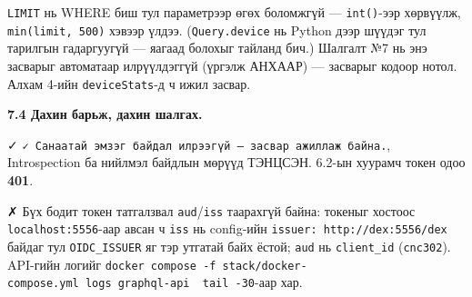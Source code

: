 \begin{Shaded}
\begin{Highlighting}[]
\OperatorTok{=}\NormalTok{\{}\NormalTok{: }\NormalTok{,}
      \NormalTok{: \{}\NormalTok{: }\NormalTok{: }\NormalTok{\}}
\end{Highlighting}
\end{Shaded}

\texttt{LIMIT} нь WHERE биш тул параметрээр өгөх боломжгүй --- \texttt{int()}-ээр хөрвүүлж, \texttt{min(limit,\ 500)} хэвээр үлдээ. (\texttt{Query.device} нь Python дээр шүүдэг тул тарилгын гадаргуугүй --- яагаад болохыг тайланд бич.) Шалгалт №7 нь энэ засварыг автоматаар илрүүлдэггүй (үргэлж АНХААР) --- засварыг кодоор нотол. Алхам 4-ийн \texttt{deviceStats}-д ч ижил засвар.

\textbf{7.4 Дахин барьж, дахин шалгах.}

\begin{Shaded}
\begin{Highlighting}[]
\KeywordTok{\&\&} \KeywordTok{\&\&} 
\KeywordTok{\textbackslash{}}
    \KeywordTok{\textbackslash{}}
    \KeywordTok{|} 
\end{Highlighting}
\end{Shaded}

✓ \texttt{✓\ Санаатай\ эмзэг\ байдал\ илрээгүй\ —\ засвар\ ажиллаж\ байна.\allowbreak{}}, Introspection ба нийлмэл байдлын мөрүүд ТЭНЦСЭН. 6.2-ын хуурамч токен одоо \textbf{401}.

✗ Бүх бодит токен татгалзвал \texttt{aud}/\allowbreak\texttt{iss} таарахгүй байна: токеныг хостоос \texttt{localhost:5556}-аар авсан ч \texttt{iss} нь config-ийн \texttt{issuer:\allowbreak{}\ http:\allowbreak{}/\allowbreak{}/\allowbreak{}dex:\allowbreak{}5556/\allowbreak{}dex} байдаг тул \texttt{OIDC\_ISSUER} яг тэр утгатай байх ёстой; \texttt{aud} нь \texttt{client\_id} (\texttt{cnc302}). API-гийн логийг \texttt{docker\ compose\ -f\ stack/docker-compose.yml\ logs\ graphql-api\ \textbar{}\ tail\ -30}-аар хар.


